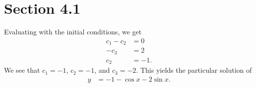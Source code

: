 \documentclass[10pt]{mypackage}
\begin{document}
\RaggedRight
\section{Section 4.1}%
\renewcommand{\arraystretch}{1.5}
\begin{solution}[Problem 4]
  Evaluating with the initial conditions, we get
  \begin{align*}
    c_1- c_2 &= 0\\
    - c_3 &= 2\\
    c_2 &= -1.
  \end{align*}
  We see that $c_1 = -1$, $c_2 = -1$, and $c_3 = -2$. This yields the particular solution of
  \begin{align*}
    y &= -1 - \cos x - 2 \sin x.
  \end{align*}
\end{solution}
\end{document}
